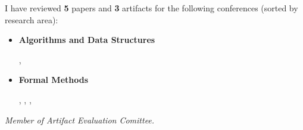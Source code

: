 
I have reviewed {\bf 5} papers and {\bf 3} artifacts for the following conferences (sorted by
research area):

\smallskip

\begin{itemize}
\item[] {\bf Algorithms and Data Structures}

  \smallskip

  , 

  \medskip

\item[] {\bf Formal Methods}

  \smallskip

  , , , 

\end{itemize}

\medskip

\textdagger\quad \emph{Member of Artifact Evaluation Comittee.} %